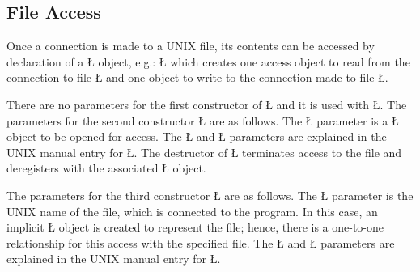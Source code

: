 \documentclass[openright,twoside]{report}
\begin{document}
\subsection{File Access}

Once a connection is made to a UNIX file, its contents can be accessed by declaration of a \LGinlinetrue\LGbegin\lgrinde\L{}\endlgrinde\LGend{} object, e.g.:
\LGinlinefalse\LGbegin\lgrinde
\L{}
\endlgrinde\LGend
which creates one access object to read from the connection to file \LGinlinetrue\LGbegin\lgrinde\L{}\endlgrinde\LGend{} and one object to write to the connection made to file \LGinlinetrue\LGbegin\lgrinde\L{}\endlgrinde\LGend{}.

There are no parameters for the first constructor of \LGinlinetrue\LGbegin\lgrinde\L{}\endlgrinde\LGend{} and it is used with \LGinlinetrue\LGbegin\lgrinde\L{}\endlgrinde\LGend{}.
The parameters for the second constructor \LGinlinetrue\LGbegin\lgrinde\L{}\endlgrinde\LGend{} are as follows.
The \LGinlinetrue\LGbegin\lgrinde\L{}\endlgrinde\LGend{} parameter is a \LGinlinetrue\LGbegin\lgrinde\L{}\endlgrinde\LGend{} object to be opened for access.
The \LGinlinetrue\LGbegin\lgrinde\L{}\endlgrinde\LGend{} and \LGinlinetrue\LGbegin\lgrinde\L{}\endlgrinde\LGend{} parameters are explained in the UNIX manual entry for \LGinlinetrue\LGbegin\lgrinde\L{}\endlgrinde\LGend{}.
The destructor of \LGinlinetrue\LGbegin\lgrinde\L{}\endlgrinde\LGend{} terminates access to the file and deregisters with the associated \LGinlinetrue\LGbegin\lgrinde\L{}\endlgrinde\LGend{} object.

The parameters for the third constructor \LGinlinetrue\LGbegin\lgrinde\L{}\endlgrinde\LGend{} are as follows.
The \LGinlinetrue\LGbegin\lgrinde\L{}\endlgrinde\LGend{} parameter is the UNIX name of the file, which is connected to the program.
In this case, an implicit \LGinlinetrue\LGbegin\lgrinde\L{}\endlgrinde\LGend{} object is created to represent the file;
hence, there is a one-to-one relationship for this access with the specified file.
The \LGinlinetrue\LGbegin\lgrinde\L{}\endlgrinde\LGend{} and \LGinlinetrue\LGbegin\lgrinde\L{}\endlgrinde\LGend{} parameters are explained in the UNIX manual entry for \LGinlinetrue\LGbegin\lgrinde\L{}\endlgrinde\LGend{}.
\end{document}

